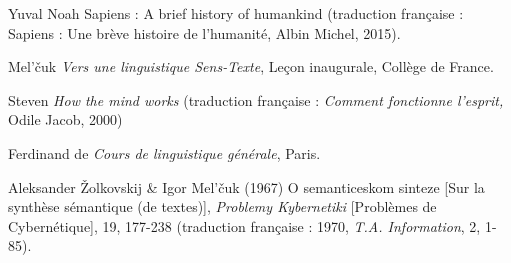 {    Yuval Noah \citet{Harari2014} Sapiens : A brief history of humankind (traduction française : Sapiens : Une brève histoire de l’humanité, Albin Michel, 2015).

    Mel’čuk \citet{Igor1997} \textit{Vers une linguistique Sens-Texte}, Leçon inaugurale, Collège de France.

    Steven \citet{Pinker1996} \textit{How the mind works} (traduction française : \textit{Comment fonctionne l’esprit,} Odile Jacob, 2000)

    Ferdinand de \citet{Saussure1916} \textit{Cours de linguistique générale}, Paris.

    Aleksander Žolkovskij \& Igor Mel’čuk (1967) O semanticeskom sinteze [Sur la synthèse sémantique (de textes)], \textit{Problemy Kybernetiki} [Problèmes de Cybernétique], 19, 177-238 (traduction française : 1970, \textit{T.A. Information}, 2, 1-85).
}
